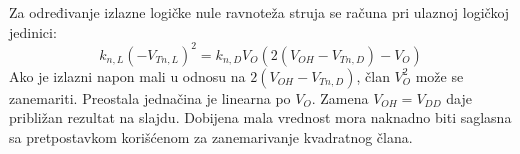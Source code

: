 Za određivanje izlazne logičke nule ravnoteža struja se računa pri ulaznoj logičkoj jedinici:
\[k_{n,L}(-V_{Tn,L})^2=k_{n,D}V_O\left(2(V_{OH}-V_{Tn,D})-V_O\right)\]
Ako je izlazni napon mali u odnosu na $2(V_{OH}-V_{Tn,D})$, član $V_O^2$ može se zanemariti. Preostala jednačina je linearna po $V_O$. Zamena $V_{OH}=V_{DD}$ daje približan rezultat na slajdu. Dobijena mala vrednost mora naknadno biti saglasna sa pretpostavkom korišćenom za zanemarivanje kvadratnog člana.
